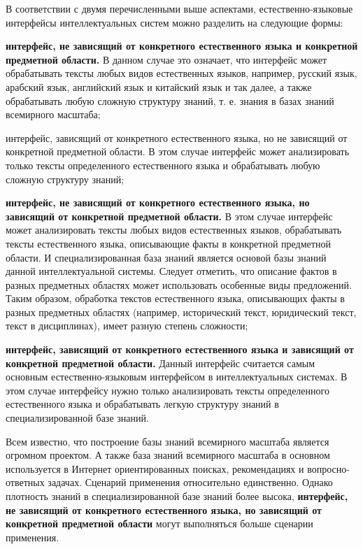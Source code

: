 В соответствии с двумя перечисленными выше аспектами, естественно-языковые интерфейсы интеллектуальных систем можно разделить на следующие формы:
\begin{textitemize}
	\item \textbf{интерфейс, не зависящий от конкретного естественного языка и конкретной предметной области.} В данном случае это означает, что интерфейс может обрабатывать тексты любых видов естественных языков, например, русский язык, арабский язык, английский язык и китайский язык и так далее, а также обрабатывать любую сложную структуру знаний, т. е. знания в базах знаний всемирного масштаба;
	\item интерфейс, зависящий от конкретного естественного языка, но не зависящий от конкретной предметной области. В этом случае интерфейс может анализировать только тексты определенного естественного языка и обрабатывать любую сложную структуру знаний;
	\item \textbf{интерфейс, не зависящий от конкретного естественного языка, но зависящий от конкретной предметной области.} В этом случае интерфейс может анализировать тексты любых видов естественных языков, обрабатывать тексты естественного языка, описывающие факты в конкретной предметной области. И специализированная база знаний является основой базы знаний данной интеллектуальной системы. Следует отметить, что описание фактов в разных предметных областях может использовать особенные виды предложений. Таким образом, обработка текстов естественного языка, описывающих факты в разных предметных областях (например, исторический текст, юридический текст, текст в дисциплинах), имеет разную степень сложности;
	\item \textbf{интерфейс, зависящий от конкретного естественного языка и зависящий от конкретной предметной области.} Данный интерфейс считается самым основным естественно-языковым интерфейсом в интеллектуальных системах. В этом случае интерфейсу нужно только анализировать тексты определенного естественного языка и обрабатывать легкую структуру знаний в специализированной базе знаний. 	
\end{textitemize}

Всем известно, что построение базы знаний всемирного масштаба является огромном проектом. А также база знаний всемирного масштаба в основном используется в Интернет ориентированных поисках, рекомендациях и вопросно-ответных задачах. Сценарий применения относительно единственно. Однако плотность знаний в специализированной базе знаний более высока, \textbf{интерфейс, не зависящий от конкретного естественного языка, но зависящий от конкретной предметной области} могут выполняться больше сценарии применения. 

